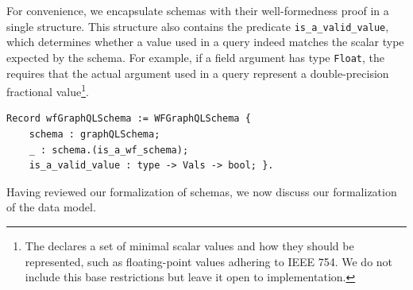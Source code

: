 For convenience, we encapsulate schemas with their well-formedness
proof in a single structure. This structure also contains the
predicate \texttt{is_a_valid_value}, which determines whether
a value used in a query indeed matches the scalar type expected by the
schema. For example, if a field argument has type \texttt{Float}, the
\spec requires that the actual argument used in a query represent a double-precision fractional value\footnote{The \spec declares a set of minimal scalar values and how they should be represented, such as floating-point values adhering to IEEE 754. We do not include this base restrictions but leave it open to implementation.}.
%
\begin{verbatim}
Record wfGraphQLSchema := WFGraphQLSchema {
    schema : graphQLSchema;
    _ : schema.(is_a_wf_schema);
    is_a_valid_value : type -> Vals -> bool; }.
\end{verbatim}





Having reviewed our formalization of schemas, we now discuss our formalization of the data model. 

